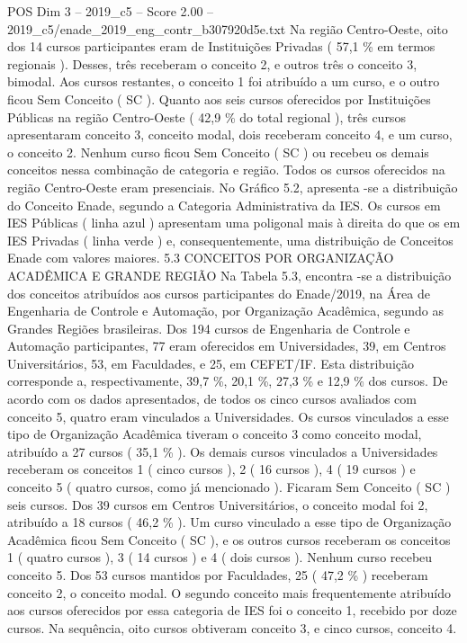 \begin{textsample}{POS Dim 3 – 2019\_c5 – Score 2.00 – 2019\_c5/enade\_2019\_eng\_contr\_b307920d5e.txt}
Na região Centro-Oeste, oito dos 14 cursos participantes eram de Instituições Privadas ( 57,1 \% em termos regionais ).
Desses, três receberam o conceito 2, e outros três o conceito 3, bimodal.
Aos cursos restantes, o conceito 1 foi atribuído a um curso, e o outro ficou Sem Conceito ( SC ).
Quanto aos seis cursos oferecidos por Instituições Públicas na região Centro-Oeste ( 42,9 \% do total regional ), três cursos apresentaram conceito 3, conceito modal, dois receberam conceito 4, e um curso, o conceito 2.
Nenhum curso ficou Sem Conceito ( SC ) ou recebeu os demais conceitos nessa combinação de categoria e região.
Todos os cursos oferecidos na região Centro-Oeste eram presenciais.
No Gráfico 5.2, apresenta -se a distribuição do Conceito Enade, segundo a Categoria Administrativa da IES.
Os cursos em IES Públicas ( linha azul ) apresentam uma poligonal mais à direita do que os em IES Privadas ( linha verde ) e, consequentemente, uma distribuição de Conceitos Enade com valores maiores. 5.3 CONCEITOS POR ORGANIZAÇÃO ACADÊMICA E GRANDE REGIÃO Na Tabela 5.3, encontra -se a distribuição dos conceitos atribuídos aos cursos participantes do Enade/2019, na Área de Engenharia de Controle e Automação, por Organização Acadêmica, segundo as Grandes Regiões brasileiras.
Dos 194 cursos de Engenharia de Controle e Automação participantes, 77 eram oferecidos em Universidades, 39, em Centros Universitários, 53, em Faculdades, e 25, em CEFET/IF.
Esta distribuição corresponde a, respectivamente, 39,7 \%, 20,1 \%, 27,3 \% e 12,9 \% dos cursos.
De acordo com os dados apresentados, de todos os cinco cursos avaliados com conceito 5, quatro eram vinculados a Universidades.
Os cursos vinculados a esse tipo de Organização Acadêmica tiveram o conceito 3 como conceito modal, atribuído a 27 cursos ( 35,1 \% ).
Os demais cursos vinculados a Universidades receberam os conceitos 1 ( cinco cursos ), 2 ( 16 cursos ), 4 ( 19 cursos ) e conceito 5 ( quatro cursos, como já mencionado ).
Ficaram Sem Conceito ( SC ) seis cursos.
Dos 39 cursos em Centros Universitários, o conceito modal foi 2, atribuído a 18 cursos ( 46,2 \% ).
Um curso vinculado a esse tipo de Organização Acadêmica ficou Sem Conceito ( SC ), e os outros cursos receberam os conceitos 1 ( quatro cursos ), 3 ( 14 cursos ) e 4 ( dois cursos ).
Nenhum curso recebeu conceito 5.
Dos 53 cursos mantidos por Faculdades, 25 ( 47,2 \% ) receberam conceito 2, o conceito modal.
O segundo conceito mais frequentemente atribuído aos cursos oferecidos por essa categoria de IES foi o conceito 1, recebido por doze cursos.
Na sequência, oito cursos obtiveram conceito 3, e cinco cursos, conceito 4.

\end{textsample}
